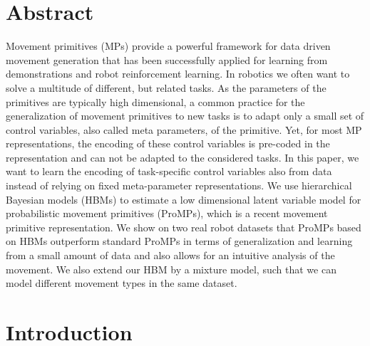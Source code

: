 \section*{Abstract}
Movement primitives (MPs) provide a powerful framework for data driven movement generation that
has been successfully applied for learning from demonstrations and robot reinforcement learning. 
In robotics we often want to solve a multitude of different, but related tasks. As the parameters of the primitives are typically high 
dimensional, a common practice for the generalization of movement primitives to new tasks is to 
adapt only a small set of control variables, also called meta parameters, of the primitive. Yet, for most MP representations, the encoding
of these control variables is pre-coded in the representation and can not be adapted to the considered tasks. 
In this paper, we want to learn the encoding of task-specific control variables also from data instead of relying on fixed meta-parameter representations. 
We use hierarchical Bayesian models (HBMs) to estimate a low dimensional latent variable model 
for probabilistic movement primitives (ProMPs), which is a recent movement primitive representation. We show on two real robot 
datasets that ProMPs based on HBMs outperform standard ProMPs in terms of generalization and learning from a small amount of data 
and also allows for an intuitive analysis of the movement. We also extend our HBM by a mixture model, such that we can model 
different movement types in the same dataset. 

\section{Introduction}

